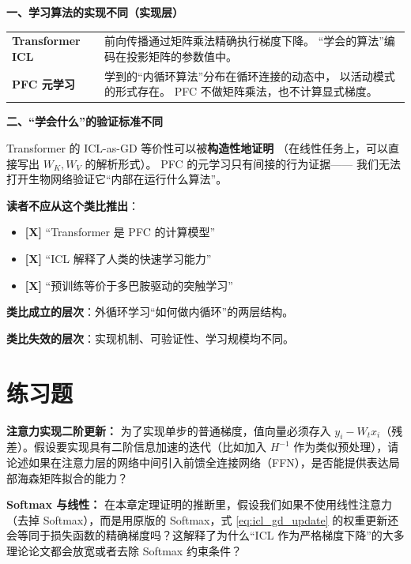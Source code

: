 \begin{analogyboundarybox}[title=这个类比在哪里失效]

\textbf{一、学习算法的实现不同（实现层）}

\begin{tabular}{p{5cm} p{8cm}}
\textbf{Transformer ICL}
& 前向传播通过矩阵乘法精确执行梯度下降。
  ``学会的算法''编码在投影矩阵的参数值中。 \\
\textbf{PFC 元学习}
& 学到的``内循环算法''分布在循环连接的动态中，
  以活动模式的形式存在。
  PFC 不做矩阵乘法，也不计算显式梯度。 \\
\end{tabular}

\medskip\textbf{二、``学会什么''的验证标准不同}

Transformer 的 ICL-as-GD 等价性可以被\textbf{构造性地证明}
（在线性任务上，可以直接写出 $W_K, W_V$ 的解析形式）。
PFC 的元学习只有间接的行为证据——
我们无法打开生物网络验证它``内部在运行什么算法''。

\medskip\textbf{读者不应从这个类比推出}：
\begin{itemize}
  \item \textbf{[X]} ``Transformer 是 PFC 的计算模型''
  \item \textbf{[X]} ``ICL 解释了人类的快速学习能力''
  \item \textbf{[X]} ``预训练等价于多巴胺驱动的突触学习''
\end{itemize}

\medskip
\textbf{类比成立的层次}：外循环学习``如何做内循环''的两层结构。

\textbf{类比失效的层次}：实现机制、可验证性、学习规模均不同。

\end{analogyboundarybox}

\section{练习题}
\label{sec:icl_exercises}


\begin{exercise}
\textbf{注意力实现二阶更新：}
为了实现单步的普通梯度，值向量必须存入 $y_i - W_tx_i$（残差）。假设要实现具有二阶信息加速的迭代（比如加入 $H^{-1}$ 作为类似预处理），请论述如果在注意力层的网络中间引入前馈全连接网络（FFN），是否能提供表达局部海森矩阵拟合的能力？
\end{exercise}

\begin{exercise}
\textbf{Softmax 与线性：}
在本章定理证明的推断里，假设我们如果不使用线性注意力（去掉 Softmax），而是用原版的 Softmax，式 \eqref{eq:icl_gd_update} 的权重更新还会等同于损失函数的精确梯度吗？这解释了为什么“ICL 作为严格梯度下降”的大多理论论文都会放宽或者去除 Softmax 约束条件？
\end{exercise}

